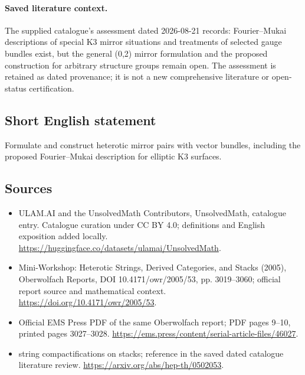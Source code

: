 \documentclass[11pt]{article}
\begin{document}
\paragraph{Saved literature context.} The supplied catalogue's assessment dated 2026-08-21 records: Fourier--Mukai descriptions of special K3 mirror situations and treatments of selected gauge bundles exist, but the general (0,2) mirror formulation and the proposed construction for arbitrary structure groups remain open. The assessment is retained as dated provenance; it is not a new comprehensive literature or open-status certification.
\subsection{Short English statement}
Formulate and construct heterotic mirror pairs with vector bundles, including the proposed Fourier--Mukai description for elliptic K3 surfaces.
\subsection{Sources}
\begin{itemize}
\item[\hypertarget{source:statement:1}{S1}] ULAM.AI and the UnsolvedMath Contributors, UnsolvedMath, catalogue entry. Catalogue curation under CC BY 4.0; definitions and English exposition added locally.
\url{https://huggingface.co/datasets/ulamai/UnsolvedMath}.
\item[\hypertarget{source:statement:2}{S2}] Mini-Workshop: Heterotic Strings, Derived Categories, and Stacks (2005), Oberwolfach Reports, DOI 10.4171/owr/2005/53, pp. 3019--3060; official report source and mathematical context.
\url{https://doi.org/10.4171/owr/2005/53}.
\item[\hypertarget{source:statement:3}{S3}] Official EMS Press PDF of the same Oberwolfach report; PDF pages 9--10, printed pages 3027--3028.
\url{https://ems.press/content/serial-article-files/46027}.
\item[\hypertarget{source:statement:4}{S4}] string compactifications on stacks; reference in the saved dated catalogue literature review.
\url{https://arxiv.org/abs/hep-th/0502053}.
\end{itemize}
\label{end:statement}
\end{document}
